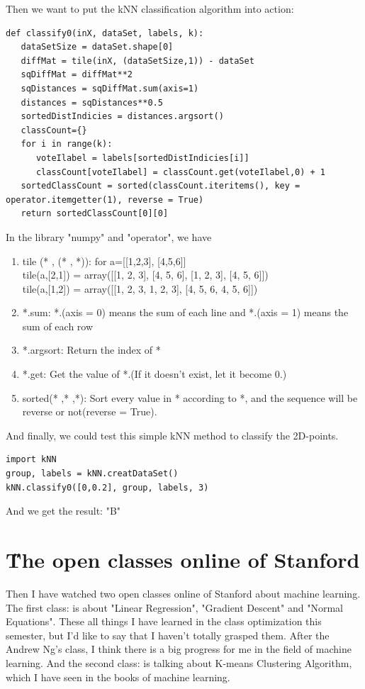 \documentclass[12pt]{article}
\begin{document}
Then we want to put the kNN classification algorithm into action:
\begin{lstlisting}
def classify0(inX, dataSet, labels, k):
   dataSetSize = dataSet.shape[0]
   diffMat = tile(inX, (dataSetSize,1)) - dataSet
   sqDiffMat = diffMat**2
   sqDistances = sqDiffMat.sum(axis=1)
   distances = sqDistances**0.5
   sortedDistIndicies = distances.argsort() 
   classCount={}
   for i in range(k):
      voteIlabel = labels[sortedDistIndicies[i]]
      classCount[voteIlabel] = classCount.get(voteIlabel,0) + 1
   sortedClassCount = sorted(classCount.iteritems(), key = operator.itemgetter(1), reverse = True)
   return sortedClassCount[0][0]
\end{lstlisting}
In the library "numpy" and "operator", we have
\begin{enumerate}
    \item tile (* , (* , *)): for a=[[1,2,3], [4,5,6]]\\tile(a,[2,1]) = array([[1, 2, 3], [4, 5, 6], [1, 2, 3], [4, 5, 6]])\\tile(a,[1,2]) = array([[1, 2, 3, 1, 2, 3], [4, 5, 6, 4, 5, 6]])
    \item *.sum: *.(axis = 0) means the sum of each line and *.(axis = 1) means the sum of each row
    \item *.argsort: Return the index of *
	\item *.get: Get the value of *.(If it doesn't exist, let it become 0.)
	\item sorted(* ,* ,*): Sort every value in * according to *, and the sequence will be reverse or not(reverse = True).
\end{enumerate}

And finally, we could test this simple kNN method to classify the 2D-points.
\begin{lstlisting}
import kNN
group, labels = kNN.creatDataSet()
kNN.classify0([0,0.2], group, labels, 3)
\end{lstlisting}

And we get the result: "B"

\section{\H The open classes online of Stanford}

Then I have watched two open classes online of Stanford about machine learning. The first class:\cite{class1} is about "Linear Regression", "Gradient Descent" and "Normal Equations". These all things I have learned in the class optimization this semester, but I'd like to say that I haven't totally grasped them. After the Andrew Ng's class, I think there is a big progress for me in the field of machine learning. And the second class:\cite{class2} is talking about K-means Clustering Algorithm, which I have seen in the books of machine learning. 
\end{document}
